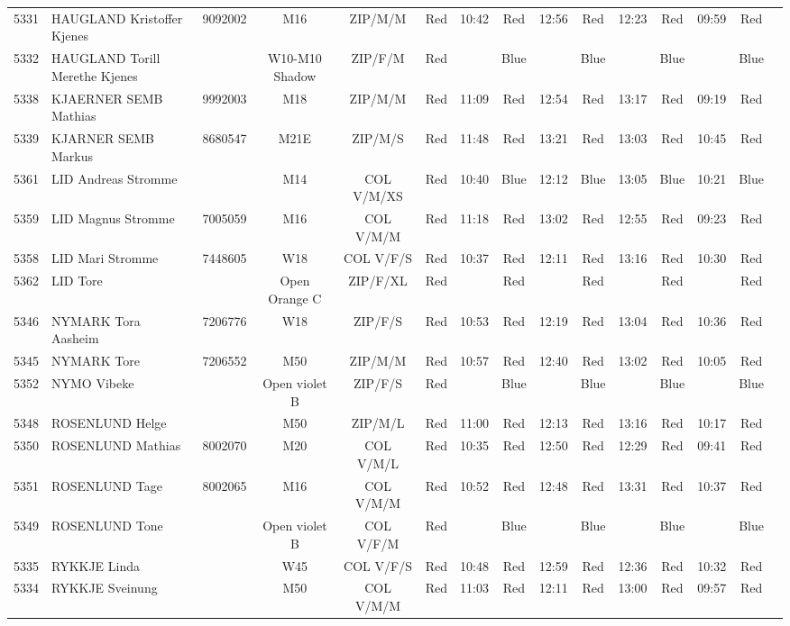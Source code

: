 \documentclass{report}
\begin{document}
\begin{longtable}{|c|l|r|c|c|*{5}{cc|}}
    5331 & HAUGLAND Kristoffer Kjenes & 9092002 & M16 & ZIP/M/M & Red & 10:42 & Red & 12:56 & Red & 12:23 & Red & 09:59 & Red &  \\
    5332 & HAUGLAND Torill Merethe Kjenes &  & W10-M10 Shadow & ZIP/F/M & Red &   & Blue &   & Blue &   & Blue &   & Blue &  \\
    5338 & KJAERNER SEMB Mathias & 9992003 & M18 & ZIP/M/M & Red & 11:09 & Red & 12:54 & Red & 13:17 & Red & 09:19 & Red &  \\
    5339 & KJARNER SEMB Markus & 8680547 & M21E & ZIP/M/S & Red & 11:48 & Red & 13:21 & Red & 13:03 & Red & 10:45 & Red &  \\
    5361 & LID Andreas Stromme &  & M14 & COL V/M/XS & Red & 10:40 & Blue & 12:12 & Blue & 13:05 & Blue & 10:21 & Blue &  \\
    5359 & LID Magnus Stromme & 7005059 & M16 & COL V/M/M & Red & 11:18 & Red & 13:02 & Red & 12:55 & Red & 09:23 & Red &  \\
    5358 & LID Mari Stromme & 7448605 & W18 & COL V/F/S & Red & 10:37 & Red & 12:11 & Red & 13:16 & Red & 10:30 & Red &  \\
    5362 & LID Tore &  & Open Orange C & ZIP/F/XL & Red &   & Red &   & Red &   & Red &   & Red &  \\
    5346 & NYMARK Tora Aasheim & 7206776 & W18 & ZIP/F/S & Red & 10:53 & Red & 12:19 & Red & 13:04 & Red & 10:36 & Red &  \\
    5345 & NYMARK Tore & 7206552 & M50 & ZIP/M/M & Red & 10:57 & Red & 12:40 & Red & 13:02 & Red & 10:05 & Red &  \\
    5352 & NYMO Vibeke &  & Open violet B & ZIP/F/S & Red &   & Blue &   & Blue &   & Blue &   & Blue &  \\
    5348 & ROSENLUND Helge &  & M50 & ZIP/M/L & Red & 11:00 & Red & 12:13 & Red & 13:16 & Red & 10:17 & Red &  \\
    5350 & ROSENLUND Mathias & 8002070 & M20 & COL V/M/L & Red & 10:35 & Red & 12:50 & Red & 12:29 & Red & 09:41 & Red &  \\
    5351 & ROSENLUND Tage & 8002065 & M16 & COL V/M/M & Red & 10:52 & Red & 12:48 & Red & 13:31 & Red & 10:37 & Red &  \\
    5349 & ROSENLUND Tone &  & Open violet B & COL V/F/M & Red &   & Blue &   & Blue &   & Blue &   & Blue &  \\
    5335 & RYKKJE Linda &  & W45 & COL V/F/S & Red & 10:48 & Red & 12:59 & Red & 12:36 & Red & 10:32 & Red &  \\
    5334 & RYKKJE Sveinung &  & M50 & COL V/M/M & Red & 11:03 & Red & 12:11 & Red & 13:00 & Red & 09:57 & Red &  \\

\end{longtable}
\end{document}
